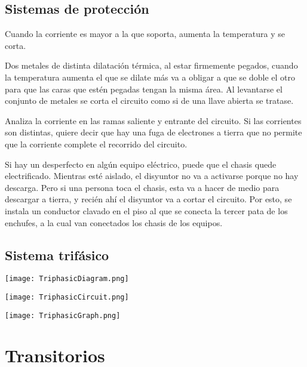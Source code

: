 \documentclass[a5paper,12pt,twoside]{book}
\begin{document}
\subsection*{Sistemas de protección}

 Cuando la corriente es mayor a la que soporta, aumenta la temperatura y se corta.

 Dos metales de distinta dilatación térmica, al estar firmemente pegados, cuando la temperatura aumenta el que se dilate más va a obligar a que se doble el otro para que las caras que estén pegadas tengan la misma área. Al levantarse el conjunto de metales se corta el circuito como si de una llave abierta se tratase.

 Analiza la corriente en las ramas saliente y entrante del circuito. Si las corrientes son distintas, quiere decir que hay una fuga de electrones a tierra que no permite que la corriente complete el recorrido del circuito.

 Si hay un desperfecto en algún equipo eléctrico, puede que el chasis quede electrificado. Mientras esté aislado, el disyuntor no va a activarse porque no hay descarga. Pero si una persona toca el chasis, esta va a hacer de medio para descargar a tierra, y recién ahí el disyuntor va a cortar el circuito. Por esto, se instala un conductor clavado en el piso al que se conecta la tercer pata de los enchufes, a la cual van conectados los chasis de los equipos.


\subsection*{Sistema trifásico}

\begin{center}
    \texttt{[image: TriphasicDiagram.png]}
\end{center}

\begin{center}
    \texttt{[image: TriphasicCircuit.png]}
\end{center}

\begin{center}
    \texttt{[image: TriphasicGraph.png]}
\end{center}


\section{Transitorios}
\end{document}
